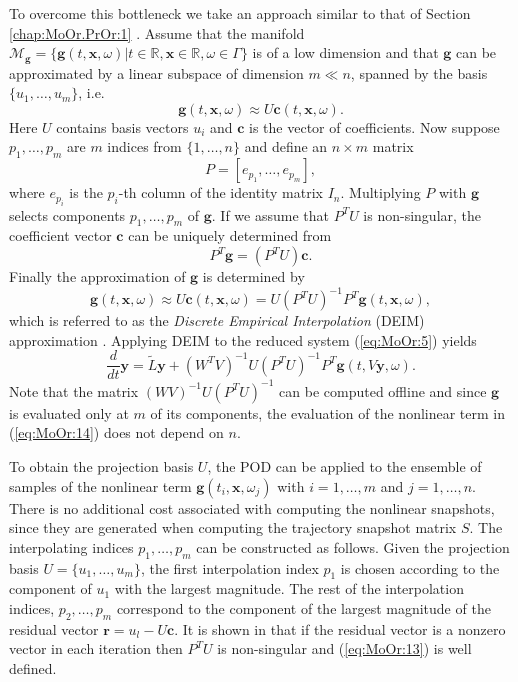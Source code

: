 {\edit To overcome this bottleneck we take an approach similar to that of Section \ref{chap:MoOr.PrOr:1} \cite{Chaturantabut:2010cz,Barrault:2004kz}}. Assume that the manifold $\mathcal M_{\mathbf g} = \{ \mathbf g(t,\mathbf x , \omega)| t\in \mathbb R, \mathbf x \in \mathbb R , \omega \in \Gamma\}$ is of a low dimension and that $\mathbf g$ can be approximated by a linear subspace of dimension $m\ll n$, spanned by the basis $\{ u_1 , \dots , u_m \}$, i.e.
\begin{equation} \label{eq:MoOr:10}
	\mathbf g(t,\mathbf x,\omega) \approx U \mathbf c(t,\mathbf x,\omega).
\end{equation}
Here $U$ contains basis vectors $u_i$ and $\mathbf c$ is the vector of coefficients. Now suppose $p_1,\dots,p_m$ are $m$ indices from $\{1,\dots,n\}$ and define an $n\times m$ matrix
\begin{equation} \label{eq:MoOr:11}
	P = [e_{p_1},\dots,e_{p_m}],
\end{equation}
where $e_{p_i}$ is the $p_i$-th column of the identity matrix $I_n$. Multiplying $P$ with $\mathbf g$ selects components $p_1,\dots,p_m$ of $\mathbf g$. If we assume that $P^TU$ is non-singular, the coefficient vector $\mathbf c$ can be uniquely determined from
\begin{equation} \label{eq:MoOr:12}
	P^T \mathbf g = (P^TU)\mathbf c.
\end{equation}
Finally the approximation of $\mathbf g$ is determined by
\begin{equation} \label{eq:MoOr:13}
	\mathbf g(t,\mathbf x,\omega) \approx U \mathbf c(t,\mathbf x,\omega) = U (P^TU)^{-1} P^T \mathbf g(t,\mathbf x,\omega),
\end{equation}
which is referred to as the \emph{Discrete Empirical Interpolation} (DEIM) approximation \cite{Chaturantabut:2010cz}. Applying DEIM to the reduced system (\ref{eq:MoOr:5}) yields
\begin{equation} \label{eq:MoOr:14}
	\frac{d}{dt} \mathbf y = \tilde L \mathbf y + (W^TV)^{-1} U(P^TU)^{-1}P^T \mathbf g(t,V\mathbf y , \omega).
\end{equation}
Note that the matrix $(WV)^{-1} U(P^TU)^{-1}$ can be computed offline and since $\mathbf g$ is evaluated only at $m$ of its components, the evaluation of the nonlinear term in (\ref{eq:MoOr:14}) does not depend on $n$.

{\edit To obtain the projection basis $U$, the POD can be applied to the ensemble of samples of the nonlinear term $\mathbf g(t_i,\mathbf x, \omega_j)$ with $i=1,\dots,m$ and $j=1,\dots,n$}. There is no additional cost {\edit associated with} computing the nonlinear snapshots, since they are generated when computing the trajectory snapshot matrix $S$. The interpolating indices $p_1,\dots,p_m$ can be constructed as follows. Given the projection basis $U = \{u_1,\dots,u_m\}$, the first interpolation index $p_1$ is chosen according to the component of $u_1$ with the largest magnitude. The rest of the interpolation indices, $p_2,\dots,p_m$ correspond to the component of the largest magnitude of the residual vector $\mathbf r = u_l - U \mathbf c$. It is shown in \cite{Chaturantabut:2010cz} that if the residual vector is a nonzero vector in each iteration then $P^TU$ is non-singular and (\ref{eq:MoOr:13}) is well defined. 

